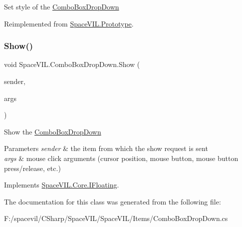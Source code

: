Set style of the \mbox{\hyperlink{class_space_v_i_l_1_1_combo_box_drop_down}{Combo\+Box\+Drop\+Down}} 



Reimplemented from \mbox{\hyperlink{class_space_v_i_l_1_1_prototype_ae96644a6ace490afb376fb542161e541}{Space\+V\+I\+L.\+Prototype}}.

\mbox{\label{class_space_v_i_l_1_1_combo_box_drop_down_a03c88461af5f952883e306c1e5da555b}} 
\subsubsection{\texorpdfstring{Show()}{Show()}}
{\footnotesize\ttfamily void Space\+V\+I\+L.\+Combo\+Box\+Drop\+Down.\+Show (\begin{DoxyParamCaption}\item[{\mbox{\hyperlink{interface_space_v_i_l_1_1_core_1_1_i_item}{I\+Item}}}]{sender,  }\item[{\mbox{\hyperlink{class_space_v_i_l_1_1_core_1_1_mouse_args}{Mouse\+Args}}}]{args }\end{DoxyParamCaption})}



Show the \mbox{\hyperlink{class_space_v_i_l_1_1_combo_box_drop_down}{Combo\+Box\+Drop\+Down}} 


\begin{DoxyParams}{Parameters}
{\em sender} & the item from which the show request is sent \\
\hline
{\em args} & mouse click arguments (cursor position, mouse button, mouse button press/release, etc.) \\
\hline
\end{DoxyParams}


Implements \mbox{\hyperlink{interface_space_v_i_l_1_1_core_1_1_i_floating}{Space\+V\+I\+L.\+Core.\+I\+Floating}}.



The documentation for this class was generated from the following file\+:\begin{DoxyCompactItemize}
\item 
F\+:/spacevil/\+C\+Sharp/\+Space\+V\+I\+L/\+Space\+V\+I\+L/\+Items/Combo\+Box\+Drop\+Down.\+cs\end{DoxyCompactItemize}
